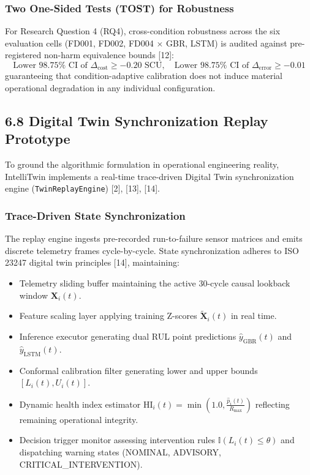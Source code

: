 \documentclass[12pt,a4paper]{article}
\begin{document}
\subsubsection*{Two One-Sided Tests (TOST) for Robustness}
For Research Question 4 (RQ4), cross-condition robustness across the six evaluation cells (FD001, FD002, FD004 $\times$ GBR, LSTM) is audited against pre-registered non-harm equivalence bounds [12]:
\begin{equation}
\text{Lower } 98.75\% \text{ CI of } \Delta_{\text{cost}} \ge -0.20 \text{ SCU}, \quad \text{Lower } 98.75\% \text{ CI of } \Delta_{\text{error}} \ge -0.01
\end{equation}
guaranteeing that condition-adaptive calibration does not induce material operational degradation in any individual configuration.

\subsection*{6.8 Digital Twin Synchronization Replay Prototype}
To ground the algorithmic formulation in operational engineering reality, IntelliTwin implements a real-time trace-driven Digital Twin synchronization engine (\texttt{TwinReplayEngine}) [2], [13], [14].

\subsubsection*{Trace-Driven State Synchronization}
The replay engine ingests pre-recorded run-to-failure sensor matrices and emits discrete telemetry frames cycle-by-cycle. State synchronization adheres to ISO 23247 digital twin principles [14], maintaining:
\begin{itemize}
    \item Telemetry sliding buffer maintaining the active 30-cycle causal lookback window $\mathbf{X}_i(t)$.
    \item Feature scaling layer applying training Z-scores $\tilde{\mathbf{X}}_i(t)$ in real time.
    \item Inference executor generating dual RUL point predictions $\hat{y}_{\text{GBR}}(t)$ and $\hat{y}_{\text{LSTM}}(t)$.
    \item Conformal calibration filter generating lower and upper bounds $[L_i(t), U_i(t)]$.
    \item Dynamic health index estimator $\text{HI}_i(t) = \min(1.0, \frac{\hat{p}_i(t)}{R_{\text{max}}})$ reflecting remaining operational integrity.
    \item Decision trigger monitor assessing intervention rules $\mathbb{I}(L_i(t) \le \theta)$ and dispatching warning states (NOMINAL, ADVISORY, CRITICAL\_INTERVENTION).
\end{itemize}
\end{document}

